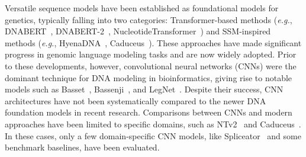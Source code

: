 Versatile sequence models have been established as foundational models for genetics, typically falling into two categories: Transformer-based methods (\textit{e.g.}, DNABERT~\citep{ji2021dnabert}, DNABERT-2~\citep{zhou2023dnabert}, NucleotideTransformer~\citep{dalla2023nucleotide}) and SSM-inspired methods (\textit{e.g.}, HyenaDNA~\citep{nguyen2024hyenadna}, Caduceus~\citep{schiff2024caduceus}). These approaches have made significant progress in genomic language modeling tasks and are now widely adopted. Prior to these developments, however, convolutional neural networks (CNNs) were the dominant technique for DNA modeling in bioinformatics, giving rise to notable models such as Basset~\citep{kelley2016basset}, Bassenji~\citep{kelley2018sequential}, and LegNet~\citep{penzar2023legnet}. Despite their %
success, CNN architectures have not been systematically compared to the newer DNA foundation models in recent research. Comparisons between CNNs and modern approaches have been limited to specific domains, such as NTv2~\citep{dalla2023nucleotide} and Caduceus~\citep{schiff2024caduceus}. In these cases, only a few domain-specific CNN models, like Spliceator~\citep{scalzitti2021spliceator} and some benchmark baselines, have been evaluated.



